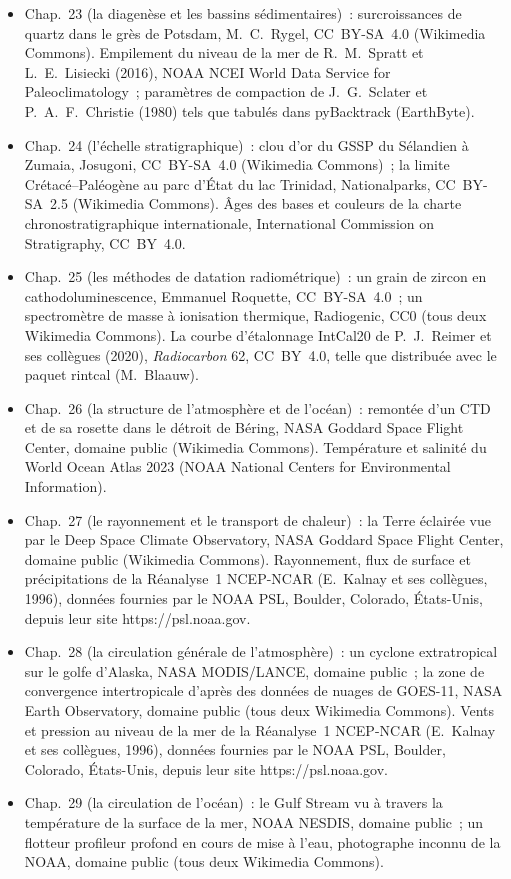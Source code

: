 \begin{itemize}
  \item Chap.~23 (la diagenèse et les bassins sédimentaires)~: surcroissances de quartz dans le grès de Potsdam, M.~C.~Rygel, CC~BY-SA~4.0 (Wikimedia Commons). Empilement du niveau de la mer de R.~M.~Spratt et L.~E.~Lisiecki (2016), NOAA NCEI World Data Service for Paleoclimatology~; paramètres de compaction de J.~G.~Sclater et P.~A.~F.~Christie (1980) tels que tabulés dans pyBacktrack (EarthByte).
  \item Chap.~24 (l'échelle stratigraphique)~: clou d'or du GSSP du Sélandien à Zumaia, Josugoni, CC~BY-SA~4.0 (Wikimedia Commons)~; la limite Crétacé--Paléogène au parc d'État du lac Trinidad, Nationalparks, CC~BY-SA~2.5 (Wikimedia Commons). Âges des bases et couleurs de la charte chronostratigraphique internationale, International Commission on Stratigraphy, CC~BY~4.0.
  \item Chap.~25 (les méthodes de datation radiométrique)~: un grain de zircon en cathodoluminescence, Emmanuel Roquette, CC~BY-SA~4.0~; un spectromètre de masse à ionisation thermique, Radiogenic, CC0 (tous deux Wikimedia Commons). La courbe d'étalonnage IntCal20 de P.~J.~Reimer et ses collègues (2020), \emph{Radiocarbon} 62, CC~BY~4.0, telle que distribuée avec le paquet rintcal (M.~Blaauw).
  \item Chap.~26 (la structure de l'atmosphère et de l'océan)~: remontée d'un CTD et de sa rosette dans le détroit de Béring, NASA Goddard Space Flight Center, domaine public (Wikimedia Commons). Température et salinité du World Ocean Atlas 2023 (NOAA National Centers for Environmental Information).
  \item Chap.~27 (le rayonnement et le transport de chaleur)~: la Terre éclairée vue par le Deep Space Climate Observatory, NASA Goddard Space Flight Center, domaine public (Wikimedia Commons). Rayonnement, flux de surface et précipitations de la Réanalyse~1 NCEP-NCAR (E.~Kalnay et ses collègues, 1996), données fournies par le NOAA PSL, Boulder, Colorado, États-Unis, depuis leur site https://psl.noaa.gov.
  \item Chap.~28 (la circulation générale de l'atmosphère)~: un cyclone extratropical sur le golfe d'Alaska, NASA MODIS/LANCE, domaine public~; la zone de convergence intertropicale d'après des données de nuages de GOES-11, NASA Earth Observatory, domaine public (tous deux Wikimedia Commons). Vents et pression au niveau de la mer de la Réanalyse~1 NCEP-NCAR (E.~Kalnay et ses collègues, 1996), données fournies par le NOAA PSL, Boulder, Colorado, États-Unis, depuis leur site https://psl.noaa.gov.
  \item Chap.~29 (la circulation de l'océan)~: le Gulf Stream vu à travers la température de la surface de la mer, NOAA NESDIS, domaine public~; un flotteur profileur profond en cours de mise à l'eau, photographe inconnu de la NOAA, domaine public (tous deux Wikimedia Commons).
\end{itemize}
